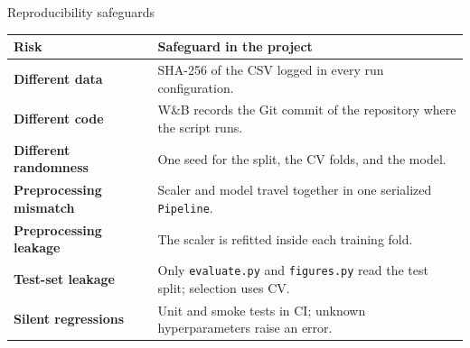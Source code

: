 \begin{frame}{Reproducibility safeguards}
\begingroup\footnotesize
\begin{tabularx}{\textwidth}{>{\bfseries}l X}
Risk & Safeguard in the project \\
\toprule
Different data & SHA-256 of the CSV logged in every run configuration. \\
\addlinespace[0.3em]
Different code & W\&B records the Git commit of the repository where the script runs. \\
\addlinespace[0.3em]
Different randomness & One seed for the split, the CV folds, and the model. \\
\addlinespace[0.3em]
Preprocessing mismatch & Scaler and model travel together in one serialized \texttt{Pipeline}. \\
\addlinespace[0.3em]
Preprocessing leakage & The scaler is refitted inside each training fold. \\
\addlinespace[0.3em]
Test-set leakage & Only \texttt{evaluate.py} and \texttt{figures.py} read the test split; selection uses CV. \\
\addlinespace[0.3em]
Silent regressions & Unit and smoke tests in CI; unknown hyperparameters raise an error. \\
\bottomrule
\end{tabularx}
\par\endgroup
\coursefooter
\end{frame}

